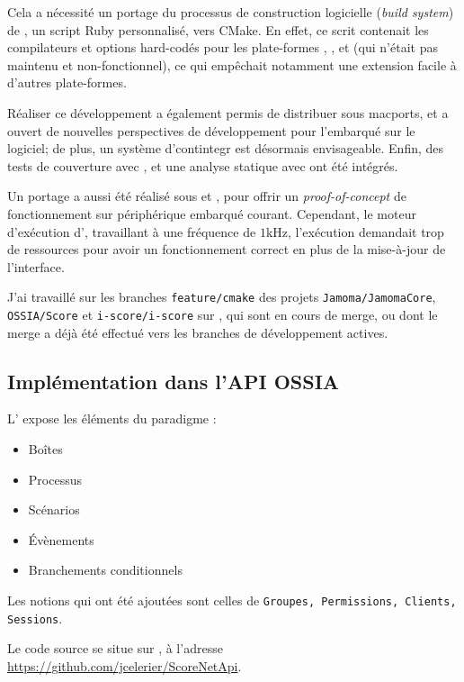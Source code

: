 Cela a nécessité un portage du processus de construction logicielle (\textit{build system})  de , un script Ruby personnalisé, vers \gls{CMake}. En effet, ce scrit contenait les compilateurs et options hard-codés pour les plate-formes , , et  (qui n'était pas maintenu et non-fonctionnel), ce qui empêchait notamment une extension facile à d'autres plate-formes.

Réaliser ce développement a également permis de distribuer  sous \gls{macports}, et a ouvert de nouvelles perspectives de développement pour l'embarqué sur le logiciel; de plus, un système d'\gls{contintegr} est désormais envisageable. Enfin, des tests de couverture avec , et une analyse statique avec  ont été intégrés.

Un portage a aussi été réalisé sous  et , pour offrir un \textit{proof-of-concept} de fonctionnement sur périphérique embarqué courant. Cependant, le moteur d'exécution d', travaillant à une fréquence de $\num{1} \si{\kHz}$, l'exécution demandait trop de ressources pour avoir un fonctionnement correct en plus de la mise-à-jour de l'interface.

J'ai travaillé sur les branches \texttt{feature/cmake} des projets \texttt{Jamoma/JamomaCore}, \texttt{OSSIA/Score} et \texttt{i-score/i-score} sur , qui sont en cours de merge, ou dont le merge a déjà été effectué vers les branches de développement actives.
\subsection{Implémentation dans l'API OSSIA}
L' expose les éléments du paradigme  : 

\begin{itemize}
	\item Boîtes
	\item Processus
	\item Scénarios
	\item Évènements
	\item Branchements conditionnels
\end{itemize}

Les notions qui ont été ajoutées sont celles de \texttt{Groupes, Permissions, Clients, Sessions}.

Le code source se situe sur , à l'adresse \url{https://github.com/jcelerier/ScoreNetApi}.

